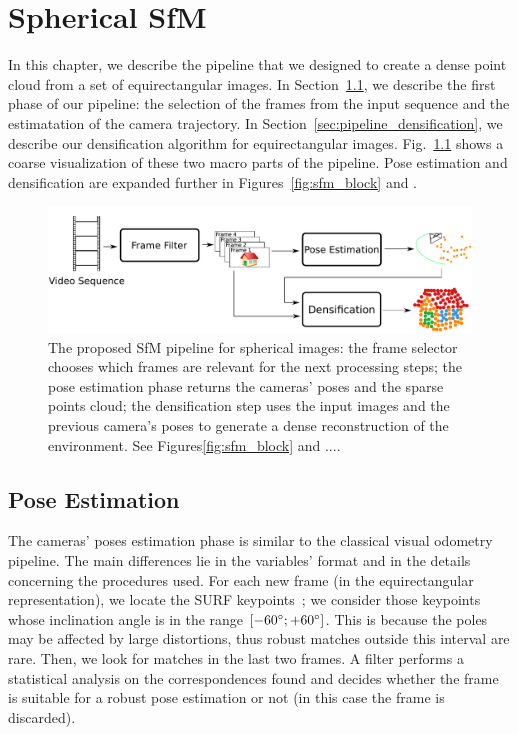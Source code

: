 \chapter{Spherical SfM}
In this chapter, we describe the pipeline that we designed to create a dense 
point cloud from a set of equirectangular images.
In Section~\ref{sec:pipeline_pose_estimation}, we describe the first phase of our
pipeline: the selection of the frames from the input sequence and the estimatation of
the camera trajectory. In Section~\ref{sec:pipeline_densification}, we describe 
our densification algorithm for equirectangular images.
Fig.~\ref{fig:pipeline_overview} shows a coarse visualization of these two macro parts of the 
pipeline. Pose estimation and densification are 
expanded further in Figures~\ref{fig:sfm_block} and .

\begin{figure}
    \centering
    \includegraphics[width=0.8\linewidth]{img/pipeline_overview.pdf}
    \caption{The proposed SfM pipeline for spherical images: the frame selector chooses which frames are 
    relevant for the next processing steps; the pose estimation phase returns the cameras' 
    poses and the sparse points cloud; the densification step uses 
    the input images and the previous camera's poses to generate a dense
    reconstruction of the environment. See Figures\ref{fig:sfm_block} and ....}
	\label{fig:pipeline_overview}
\end{figure}

\section{Pose Estimation}
\label{sec:pipeline_pose_estimation}
The cameras' poses estimation phase is similar to the classical visual 
odometry pipeline. The main differences lie in the variables' format and in 
the details concerning the procedures used.
For each new frame (in the equirectangular representation), we locate the
SURF keypoints~\cite{bay2006surf}; we consider those keypoints whose inclination angle is in the range $[-60\degree; +60\degree]$. This is because the poles may be affected by large 
distortions, thus robust matches outside this interval are rare.
Then, we look for matches in the last two frames. A filter performs a 
statistical analysis on the correspondences found and decides whether the frame 
is suitable for a robust pose estimation or not (in this case the frame is 
discarded).

